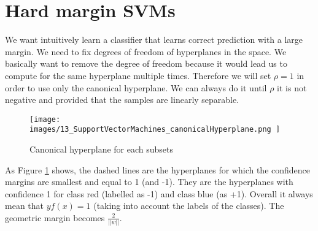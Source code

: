 \section{Hard margin SVMs}
We want intuitively learn a classifier that learns correct prediction with a
large margin. We need to fix degrees of freedom of hyperplanes in the space.
We basically want to remove the degree of freedom because it would lead us to compute
for the same hyperplane multiple times. Therefore we will set $\rho = 1$ in
order to use only the canonical hyperplane. We can always do it until $\rho$ it is
not negative and provided that the samples are linearly separable.
\begin{figure}[H]
	\centering
	\texttt{[image: 
		images/13\_SupportVectorMachines\_canonicalHyperplane.png
	]}
	\caption{Canonical hyperplane for each subsets}
	\label{fig:canonical_hyperplanes}
\end{figure}
As Figure \ref{fig:canonical_hyperplanes} shows, the dashed lines are the hyperplanes
for which the confidence margins are smallest and equal to 1 (and -1). They are the
hyperplanes with confidence 1 for class red (labelled as -1) and class blue (as +1).
Overall it always mean that $yf(x) = 1$ (taking into account the labels of the classes).
The geometric margin becomes $\frac{2}{||w||}$.

